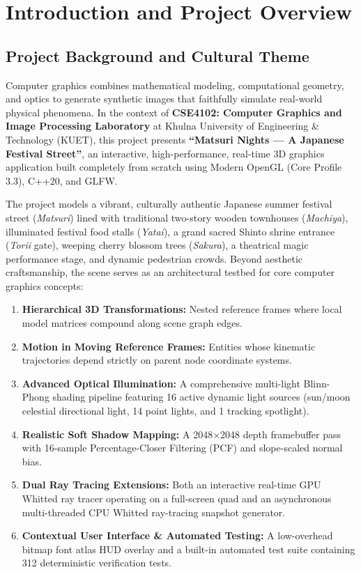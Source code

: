 \chapter{Introduction and Project Overview}
\label{chap:intro}

\section{Project Background and Cultural Theme}
Computer graphics combines mathematical modeling, computational geometry, and optics to generate synthetic images that faithfully simulate real-world physical phenomena. In the context of \textbf{CSE4102: Computer Graphics and Image Processing Laboratory} at Khulna University of Engineering \& Technology (KUET), this project presents \textbf{``Matsuri Nights --- A Japanese Festival Street''}, an interactive, high-performance, real-time 3D graphics application built completely from scratch using Modern OpenGL (Core Profile 3.3), C++20, and GLFW.

The project models a vibrant, culturally authentic Japanese summer festival street (\textit{Matsuri}) lined with traditional two-story wooden townhouses (\textit{Machiya}), illuminated festival food stalls (\textit{Yatai}), a grand sacred Shinto shrine entrance (\textit{Torii} gate), weeping cherry blossom trees (\textit{Sakura}), a theatrical magic performance stage, and dynamic pedestrian crowds. Beyond aesthetic craftsmanship, the scene serves as an architectural testbed for core computer graphics concepts:
\begin{enumerate}
    \item \textbf{Hierarchical 3D Transformations:} Nested reference frames where local model matrices compound along scene graph edges.
    \item \textbf{Motion in Moving Reference Frames:} Entities whose kinematic trajectories depend strictly on parent node coordinate systems.
    \item \textbf{Advanced Optical Illumination:} A comprehensive multi-light Blinn-Phong shading pipeline featuring 16 active dynamic light sources (sun/moon celestial directional light, 14 point lights, and 1 tracking spotlight).
    \item \textbf{Realistic Soft Shadow Mapping:} A 2048$\times$2048 depth framebuffer pass with 16-sample Percentage-Closer Filtering (PCF) and slope-scaled normal bias.
    \item \textbf{Dual Ray Tracing Extensions:} Both an interactive real-time GPU Whitted ray tracer operating on a full-screen quad and an asynchronous multi-threaded CPU Whitted ray-tracing snapshot generator.
    \item \textbf{Contextual User Interface \& Automated Testing:} A low-overhead bitmap font atlas HUD overlay and a built-in automated test suite containing 312 deterministic verification tests.
\end{enumerate}


